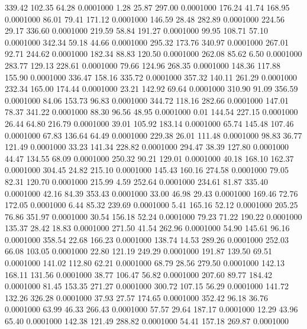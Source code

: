 339.42  102.35   64.28   0.0001000
   1.28   25.87  297.00   0.0001000
 176.24   41.74  168.95   0.0001000
  86.01   79.41  171.12   0.0001000
 146.59   28.48  282.89   0.0001000
 224.56   29.17  336.60   0.0001000
 219.59   58.84  191.27   0.0001000
  99.95  108.71   57.10   0.0001000
 342.34   59.18   44.66   0.0001000
 295.32  173.76  340.97   0.0001000
 267.01   92.71  244.62   0.0001000
 182.34   88.83  120.50   0.0001000
 262.08   85.62    6.50   0.0001000
 283.77  129.13  228.61   0.0001000
  79.66  124.96  268.35   0.0001000
 148.36  117.88  155.90   0.0001000
 336.47  158.16  335.72   0.0001000
 357.32  140.11  261.29   0.0001000
 232.34  165.00  174.44   0.0001000
  23.21  142.92   69.64   0.0001000
 310.90   91.09  356.59   0.0001000
  84.06  153.73   96.83   0.0001000
 344.72  118.16  282.66   0.0001000
 147.01   78.37  341.22   0.0001000
  88.30   96.56   48.95   0.0001000
   0.01  144.54  227.15   0.0001000
  26.44   64.80  216.79   0.0001000
  39.01  105.92  183.14   0.0001000
  65.74  145.48  107.46   0.0001000
  67.83  136.64   64.49   0.0001000
 229.38   26.01  111.48   0.0001000
  98.83   36.77  121.49   0.0001000
  33.23  141.34  228.82   0.0001000
 294.47   38.39  127.80   0.0001000
  44.47  134.55   68.09   0.0001000
 250.32   90.21  129.01   0.0001000
  40.18  168.10  162.37   0.0001000
 304.45   24.82  215.10   0.0001000
 145.43  160.16  274.58   0.0001000
  79.05   82.31  120.70   0.0001000
 215.99    4.59  252.64   0.0001000
 234.61   81.87  335.40   0.0001000
  42.16   84.39  353.43   0.0001000
  33.00   46.98   29.43   0.0001000
 169.46   72.76  172.05   0.0001000
   6.44   85.32  239.69   0.0001000
   5.41  165.16   52.12   0.0001000
 205.25   76.86  351.97   0.0001000
  30.54  156.18   52.24   0.0001000
  79.23   71.22  190.22   0.0001000
 135.37   28.42   18.83   0.0001000
 271.50   41.54  262.96   0.0001000
  54.90  145.61   96.16   0.0001000
 358.54   22.68  166.23   0.0001000
 138.74   14.53  289.26   0.0001000
 252.03   66.08  103.05   0.0001000
  22.80  121.19  249.29   0.0001000
 191.87  139.50   69.51   0.0001000
 141.02  112.80   62.21   0.0001000
  68.79   28.56  279.50   0.0001000
 142.13  168.11  131.56   0.0001000
  38.77  106.47   56.82   0.0001000
 207.60   89.77  184.42   0.0001000
  81.45  153.35  271.27   0.0001000
 300.72  107.15   56.29   0.0001000
 141.72  132.26  326.28   0.0001000
  37.93   27.57  174.65   0.0001000
 352.42   96.18   36.76   0.0001000
  63.99   46.33  266.43   0.0001000
  57.57   29.64  187.17   0.0001000
  12.29   43.96   65.40   0.0001000
 142.38  121.49  288.82   0.0001000
  54.41  157.18  269.87   0.0001000
